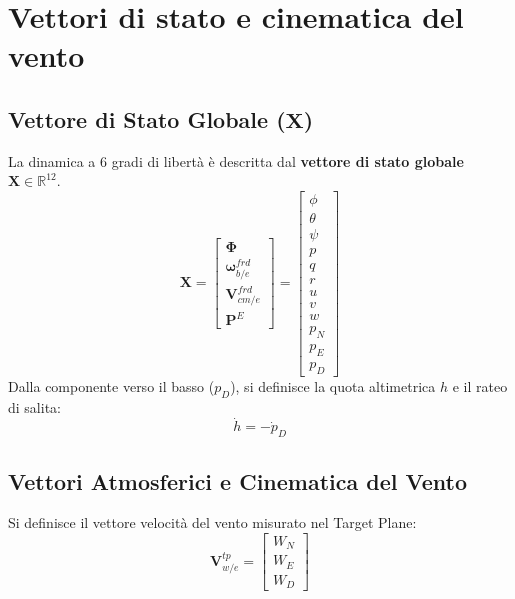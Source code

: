\section{Vettori di stato e cinematica del vento}
\subsection*{Vettore di Stato Globale ($\mathbf{X}$)}


La dinamica a 6 gradi di libertà è descritta dal \textbf{vettore di stato globale $\mathbf{X} \in \mathbb{R}^{12}$}.
\begin{equation}
\mathbf{X} = 
\begin{bmatrix}
\bm{\Phi} \\
\boldsymbol{\omega}_{b/e}^{frd} \\
\mathbf{V}_{cm/e}^{frd} \\
\mathbf{P}^E
\end{bmatrix}
=
\begin{bmatrix}
\phi \\ \theta \\ \psi \\ p \\ q \\ r \\ u \\ v \\ w \\ p_N \\ p_E \\ p_D
\end{bmatrix}
\end{equation}
Dalla componente verso il basso ($p_D$), si definisce la quota altimetrica $h$ e il rateo di salita:
\begin{equation}
\dot{h} = -\dot{p}_D
\end{equation}

\subsection*{Vettori Atmosferici e Cinematica del Vento}
Si definisce il vettore velocità del vento misurato nel Target Plane:
\begin{equation}
\mathbf{V}_{w/e}^{tp} = \begin{bmatrix} W_N \\ W_E \\ W_D \end{bmatrix}
\end{equation}

